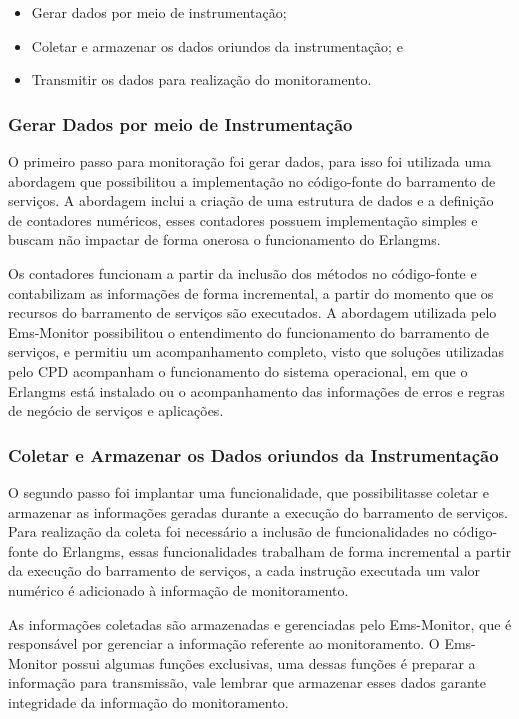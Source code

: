 \begin{itemize}
    \item Gerar dados por meio de instrumentação;
    \item Coletar e armazenar os dados oriundos da instrumentação; e
    \item Transmitir os dados para realização do monitoramento. 
\end{itemize}

\subsubsection{Gerar Dados por meio de Instrumentação}
O primeiro passo para monitoração foi gerar dados, para isso foi utilizada uma abordagem que possibilitou a implementação no código-fonte do barramento de serviços. A abordagem inclui a criação de uma estrutura de dados e a definição de contadores numéricos, esses contadores possuem implementação simples e buscam não impactar de forma onerosa o funcionamento do Erlangms.

Os contadores funcionam a partir da inclusão dos métodos no código-fonte e contabilizam as informações de forma incremental, a partir do momento que os recursos do barramento de serviços são executados. A abordagem utilizada pelo Ems-Monitor possibilitou o entendimento do funcionamento do barramento de serviços, e permitiu um acompanhamento completo, visto que soluções utilizadas pelo \acrshort{CPD} acompanham o funcionamento do sistema operacional, em que o Erlangms está instalado ou o acompanhamento das informações de erros e regras de negócio de serviços e aplicações.      

\subsubsection{Coletar e Armazenar os Dados oriundos da Instrumentação}
O segundo passo foi implantar uma funcionalidade, que possibilitasse coletar e armazenar as informações geradas durante a execução do barramento de serviços. Para realização da coleta foi necessário a inclusão de funcionalidades no código-fonte do Erlangms, essas funcionalidades trabalham de forma incremental a partir da execução do barramento de serviços, a cada instrução executada um valor numérico é adicionado à informação de monitoramento. 

As informações coletadas são armazenadas e gerenciadas pelo Ems-Monitor, que é responsável por gerenciar a informação referente ao monitoramento. O Ems-Monitor possui algumas funções exclusivas, uma dessas funções é preparar a informação para transmissão, vale lembrar que armazenar esses dados garante integridade da informação do monitoramento.

